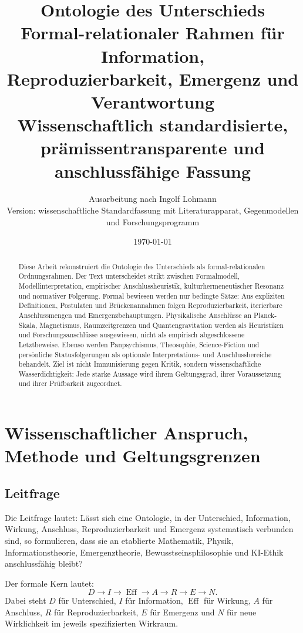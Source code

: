 \documentclass[11pt,a4paper]{article}
\title{\textbf{Ontologie des Unterschieds}\\[0.4em]
\large Formal-relationaler Rahmen für Information,\\
Reproduzierbarkeit, Emergenz und Verantwortung\\[0.3em]
\normalsize Wissenschaftlich standardisierte, prämissentransparente und anschlussfähige Fassung}
\author{Ausarbeitung nach Ingolf Lohmann\\
\small Version: wissenschaftliche Standardfassung mit Literaturapparat, Gegenmodellen und Forschungsprogramm}
\date{\today}
\theoremstyle{remark}
\newcommand{\Eff}{\operatorname{Eff}}
\begin{document}
\maketitle

\begin{abstract}
Diese Arbeit rekonstruiert die Ontologie des Unterschieds als formal-relationalen Ordnungsrahmen. Der Text unterscheidet strikt zwischen Formalmodell, Modellinterpretation, empirischer Anschlussheuristik, kulturhermeneutischer Resonanz und normativer Folgerung. Formal bewiesen werden nur bedingte Sätze: Aus expliziten Definitionen, Postulaten und Brückenannahmen folgen Reproduzierbarkeit, iterierbare Anschlussmengen und Emergenzbehauptungen. Physikalische Anschlüsse an Planck-Skala, Magnetismus, Raumzeitgrenzen und Quantengravitation werden als Heuristiken und Forschungsanschlüsse ausgewiesen, nicht als empirisch abgeschlossene Letztbeweise. Ebenso werden Panpsychismus, Theosophie, Science-Fiction und persönliche Statusfolgerungen als optionale Interpretations- und Anschlussbereiche behandelt. Ziel ist nicht Immunisierung gegen Kritik, sondern wissenschaftliche\allowbreak{} Wasserdichtigkeit: Jede starke Aussage wird ihrem Geltungsgrad, ihrer Voraussetzung und ihrer Prüfbarkeit zugeordnet.
\end{abstract}

\tableofcontents
\newpage

\section{Wissenschaftlicher Anspruch, Methode und Geltungsgrenzen}

\subsection{Leitfrage}
Die Leitfrage lautet: Lässt sich eine Ontologie, in der Unterschied, Information, Wirkung, Anschluss, Reproduzierbarkeit und Emergenz systematisch verbunden sind, so formulieren, dass sie an etablierte Mathematik, Physik, Informationstheorie, Emergenztheorie, Bewusstseinsphilosophie und KI-Ethik anschlussfähig bleibt?

Der formale Kern lautet:
\[
D \longrightarrow I \longrightarrow \Eff \longrightarrow A \longrightarrow R \longrightarrow E \longrightarrow N.
\]
Dabei steht $D$ für Unterschied, $I$ für Information, $\Eff$ für Wirkung, $A$ für Anschluss, $R$ für Reproduzierbarkeit, $E$ für Emergenz und $N$ für neue Wirklichkeit im jeweils spezifizierten Wirkraum.
\end{document}
